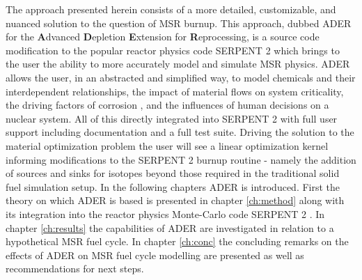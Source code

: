 The approach presented herein consists of a more detailed, customizable, and
nuanced solution to the question of MSR burnup. This approach, dubbed ADER for
the \textbf{A}dvanced \textbf{D}epletion \textbf{E}xtension for 
\textbf{R}eprocessing, is a source code modification to the popular reactor
physics code SERPENT 2 which brings to the user the ability to more accurately
model and simulate MSR physics. ADER allows the user, in an abstracted and
simplified way, to model chemicals and their interdependent relationships, the
impact of material flows on system criticality, the driving factors of corrosion
, and the influences of human decisions on a nuclear system. All of this
directly integrated into SERPENT 2 with full user support including
documentation and a full test suite. Driving the solution to the material
optimization problem the user will 
see a linear optimization kernel informing modifications to the SERPENT 2
burnup routine - namely the addition of sources and sinks for isotopes beyond
those required in the traditional solid fuel simulation setup.  
In the following chapters ADER is introduced. First the theory 
on which ADER is based is
presented in chapter \ref{ch:method} along with its integration into the reactor
physics Monte-Carlo code SERPENT 2 \cite{Jaakko}. In chapter
\ref{ch:results} the capabilities of ADER are investigated in relation to a
hypothetical MSR fuel cycle. In chapter \ref{ch:conc} the concluding remarks
on the effects of ADER on
MSR fuel cycle modelling are presented as well as recommendations for next
steps. 
